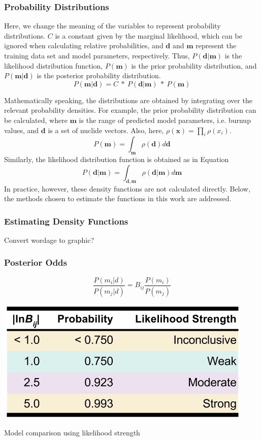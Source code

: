 
\begin{frame}
  \frametitle{Probability Distributions}
  Here, we change the meaning of the variables to represent probability
  distributions.  $C$ is a constant given by
  the marginal likelihood, which can be ignored when calculating relative
  probabilities, and $\boldsymbol{d}$ and $\boldsymbol{m}$ represent the training
  data set and model parameters, respectively. Thus,
  $P(\boldsymbol{d}|\boldsymbol{m})$ is the likelihood distribution function,
  $P(\boldsymbol{m})$ is the prior probability distribution, and
  $P(\boldsymbol{m}|\boldsymbol{d})$ is the posterior probability distribution.
  \begin{equation}
    P(\boldsymbol{m}|\boldsymbol{d}) = C\ *\
    P(\boldsymbol{d}|\boldsymbol{m})\ *\ P(\boldsymbol{m})
  \end{equation}
 
  Mathematically speaking, the distributions are obtained by integrating over the
  relevant probability densities.  For example, the prior probability
  distribution can be calculated, where
  $\boldsymbol{m}$ is the range of predicted model parameters, i.e. burnup
  values, and $\boldsymbol{d}$ is a set of nuclide vectors. Also, here,
  $\rho(\boldsymbol{x}) = \prod_{i} \rho(x_i)$. 
  \begin{equation}
    P(\boldsymbol{m}) = \int_{\boldsymbol{m}} \rho(\boldsymbol{d}) d\boldsymbol{d}
  \end{equation}
  Similarly, the likelihood distribution function is obtained as in Equation 
  \begin{equation}
    P(\boldsymbol{d}|\boldsymbol{m}) = \int_{\boldsymbol{d}, \boldsymbol{m}} \rho(\boldsymbol{d}|\boldsymbol{m}) d\boldsymbol{m}
  \end{equation}
  In practice, however, these density functions are not calculated directly.
  Below, the methods chosen to estimate the functions in this work are addressed.
\end{frame}

\begin{frame}
  \frametitle{Estimating Density Functions}
  Convert wordage to graphic?
\end{frame}

\begin{frame}
  \frametitle{Posterior Odds}
  \begin{equation}
    \frac{P(m_i|d)}{P(m_j|d)} = B_{ij} \frac{P(m_i)}{P(m_j)}
  \end{equation}
  \begin{table}
    \centering
    \includegraphics[width=0.7\linewidth]{./figures/evidence-strength.png}
    \caption{Model comparison using likelihood strength}
  \end{table}
\end{frame}
